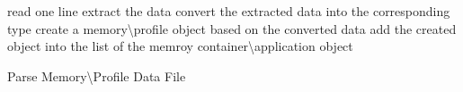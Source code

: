 \setlength{\textfloatsep}{0.2cm}
\begin{algorithm2e}[H]
	{
		read one line\;
		{
			extract the data\;
			convert the extracted data into the corresponding type\;
			create a memory\textbackslash profile object based on the converted data\;
			add the created object into the list of the memroy container\textbackslash application object\;
		}
	}
	\caption{Parse Memory\textbackslash Profile Data File}
	\label{algo:mem_profile_parser}
\end{algorithm2e}
\setlength{\textfloatsep}{0.2cm}
